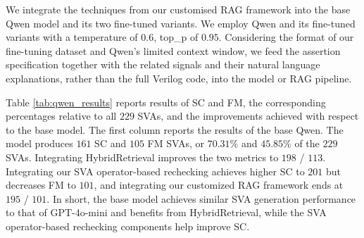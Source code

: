 We integrate the techniques from our customised RAG framework into the base Qwen model and its two fine-tuned variants. 
We employ Qwen and its fine-tuned variants with a temperature of $0.6$, top\_p of $0.95$. Considering the format of our fine-tuning dataset and Qwen’s limited context window, we  feed the assertion specification together with the related signals and their natural language explanations, rather than the full Verilog code, into the model or RAG pipeline.

Table \ref{tab:qwen_results} reports results of SC and FM, the corresponding percentages relative to all $229$ SVAs, and the improvements achieved with respect to the base model.
The first column reports the results of the base Qwen. 
The model produces $161$ SC and $105$ FM SVAs, or $70.31 \%$ and $45.85 \%$ of the $229$ SVAs. 
Integrating HybridRetrieval  improves the two metrics to $198$ / $113$. 
Integrating our SVA operator-based rechecking achieves higher SC to $201$ but decreases FM to $101$, and integrating our customized RAG framework ends at $195$ / $101$. 
In short, the base model achieves similar SVA generation performance to that of GPT-4o-mini and benefits from HybridRetrieval, while the SVA operator-based rechecking components help improve SC.

